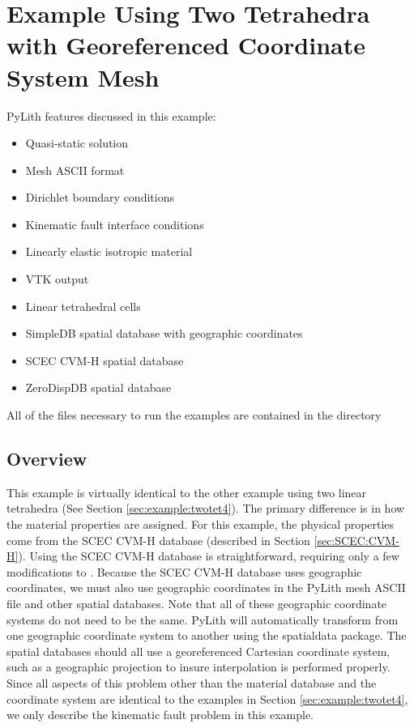 
\section{Example Using Two Tetrahedra with Georeferenced Coordinate System Mesh}
\label{sec:examples:twotet4-geoproj}

PyLith features discussed in this example:
\begin{itemize}
\item Quasi-static solution
\item Mesh ASCII format
\item Dirichlet boundary conditions
\item Kinematic fault interface conditions
\item Linearly elastic isotropic material
\item VTK output
\item Linear tetrahedral cells
\item SimpleDB spatial database with geographic coordinates
\item SCEC CVM-H spatial database
\item ZeroDispDB spatial database
\end{itemize}
All of the files necessary to run the examples are contained in the
directory 


\subsection{Overview}

This example is virtually identical to the other example using two
linear tetrahedra (See Section \vref{sec:example:twotet4}). The
primary difference is in how the material properties are assigned.
For this example, the physical properties come from the SCEC CVM-H
database (described in Section \vref{sec:SCEC:CVM-H}). Using the SCEC
CVM-H database is straightforward, requiring only a few modifications
to . Because the SCEC CVM-H database uses
geographic coordinates, we must also use geographic coordinates in the
PyLith mesh ASCII file and other spatial databases. Note that all of
these geographic coordinate systems do not need to be the same. PyLith
will automatically transform from one geographic coordinate system to
another using the spatialdata package. The spatial databases should
all use a georeferenced Cartesian coordinate system, such as a
geographic projection to insure interpolation is performed
properly. Since all aspects of this problem other than the material
database and the coordinate system are identical to the examples in
Section \vref{sec:example:twotet4}, we only describe the kinematic
fault problem in this example.


